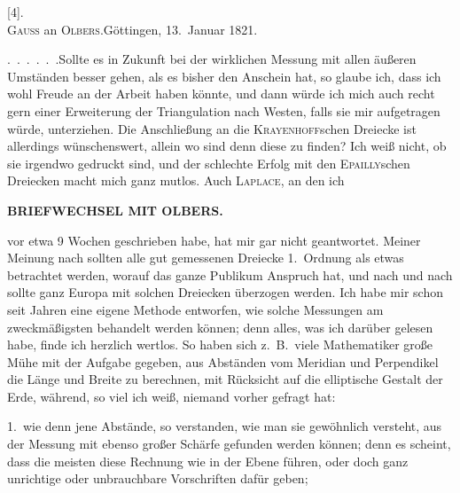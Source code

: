 \begin{center}
[4].\\
\textsc{Gauss} an \textsc{Olbers}.\quad Göttingen, 13.~Januar 1821.
\end{center}

\par\noindent\hspace*{\parindent}.\ .\ .\ .\ .\ .\quad Sollte es in Zukunft bei der wirklichen Messung mit allen äußeren Umständen besser gehen, als es bisher den Anschein hat, so glaube ich, dass ich wohl Freude an der Arbeit haben könnte, und dann würde ich mich auch recht gern einer Erweiterung der Triangulation nach Westen, falls sie mir aufgetragen würde, unterziehen.
Die Anschließung an die \textsc{Krayenhoff}schen Dreiecke ist allerdings wünschenswert, allein wo sind denn diese zu finden?
Ich weiß nicht, ob sie irgendwo gedruckt sind, und der schlechte Erfolg mit den \textsc{Epailly}schen Dreiecken macht mich ganz mutlos.
Auch \textsc{Laplace}, an den ich
\par\clearpage
{}\hfill{\small\textbf{BRIEFWECHSEL MIT OLBERS.}}\par\medskip
\noindent vor etwa 9 Wochen geschrieben habe, hat mir gar nicht geantwortet.
Meiner Meinung nach sollten alle gut gemessenen Dreiecke 1.~Ordnung als etwas betrachtet werden, worauf das ganze Publikum Anspruch hat, und nach und nach sollte ganz Europa mit solchen Dreiecken überzogen werden.
Ich habe mir schon seit Jahren eine eigene Methode entworfen, wie solche Messungen am zweckmäßigsten behandelt werden können; denn alles, was ich darüber gelesen habe, finde ich herzlich wertlos.
So haben sich z.\ B.\ viele Mathematiker große Mühe mit der Aufgabe gegeben, aus Abständen vom Meridian und Perpendikel die Länge und Breite zu berechnen, mit Rücksicht auf die elliptische Gestalt der Erde, während, so viel ich weiß, niemand vorher gefragt hat:

\par\noindent\hspace*{\parindent}1.\ wie denn jene Abstände, so verstanden, wie man sie gewöhnlich versteht, aus der Messung mit ebenso großer Schärfe gefunden werden können; denn es scheint, dass die meisten diese Rechnung wie in der Ebene führen, oder doch ganz unrichtige oder unbrauchbare Vorschriften dafür geben;

